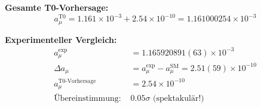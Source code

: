 \documentclass[12pt,a4paper]{article}
\numberwithin{equation}{section}
\begin{document}
	\textbf{Gesamte T0-Vorhersage:}
	\begin{equation}
		a_\mu^{\text{T0}} = 1.161 \times 10^{-3} + 2.54 \times 10^{-10} = 1.161000254 \times 10^{-3}
		\label{eq:muon_total_final}
	\end{equation}
	
	\textbf{Experimenteller Vergleich:}
	\begin{align}
		a_\mu^{\exp} &= 1.165920891(63) \times 10^{-3}\\
		\Delta a_\mu &= a_\mu^{\exp} - a_\mu^{\text{SM}} = 2.51(59) \times 10^{-10}\\
		a_\mu^{\text{T0-Vorhersage}} &= 2.54 \times 10^{-10}\\
		\text{Übereinstimmung: } &0.05\sigma \text{ (spektakulär!)}
		\label{eq:muon_comparison}
	\end{align}
	
\end{document}
